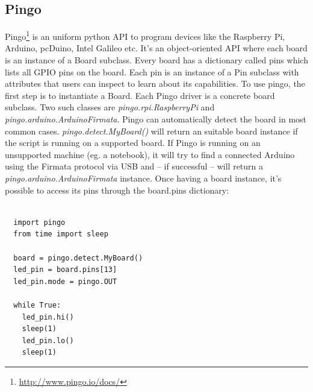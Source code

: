 \documentclass{acm_proc_article-sp}
\begin{document}

\subsection{Pingo}
Pingo\footnote{\url{http://www.pingo.io/docs/}} is an uniform python API to program devices like the Raspberry Pi, Arduino, pcDuino, Intel Galileo etc. It's an object-oriented API where each board is an instance of a Board subclass. Every board has a dictionary called pins which lists all GPIO pins on the board. Each pin is an instance of a Pin subclass with attributes that users can inspect to learn about its capabilities.
\newline
\newline
To use pingo, the first step is to instantiate a Board. Each Pingo driver is a concrete board subclass. Two such classes are \textit{pingo.rpi.RaspberryPi} and \textit{pingo.arduino.ArduinoFirmata}. Pingo can automatically detect the board in most common cases.  \textit{pingo.detect.MyBoard()} will return an suitable board instance if the script is running on a supported board. If Pingo is running on an unsupported machine (eg. a notebook), it will try to find a connected Arduino using the Firmata protocol via USB and – if successful – will return a \textit{pingo.arduino.ArduinoFirmata} instance.
\newline
\newline
Once having a board instance, it’s possible to access its pins through the board.pins dictionary:
\renewcommand{\theFancyVerbLine}{
  \sffamily\textcolor[rgb]{0.5,0.5,0.5}{\scriptsize\arabic{FancyVerbLine}}}
\begin{verbatim}

  import pingo
  from time import sleep

  board = pingo.detect.MyBoard()
  led_pin = board.pins[13]
  led_pin.mode = pingo.OUT

  while True:
    led_pin.hi()
    sleep(1)
    led_pin.lo()
    sleep(1)	
\end{verbatim}


\end{document}
